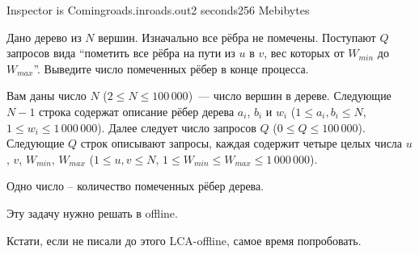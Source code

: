 \begin{problem}{Inspector is Coming}{roads.in}{roads.out}{2 seconds}{256 Mebibytes}


Дано дерево из $N$ вершин.
Изначально все рёбра не помечены.
Поступают $Q$ запросов вида ``пометить все рёбра на пути из $u$ в $v$, вес которых от $W_{min}$ до $W_{max}$''.
Выведите число помеченных рёбер в конце процесса.

\InputFile

Вам даны число $N$ ($2 \le N \le 100\,000$)~--- число вершин в дереве.
Следующие $N-1$ строка содержат описание рёбер дерева $a_i$, $b_i$ и $w_i$ 
($1 \le a_i, b_i \le N$, $1 \le w_i \le 1\,000\,000$).
Далее следует число запросов $Q$ ($0 \le Q \le 100\,000$).
Следующие $Q$ строк описывают запросы, каждая содержит четыре целых числа
$u$, $v$, $W_{min}$, $W_{max}$ ($1 \le u, v \le N$, $1 \le W_{min} \le W_{max} \le 
1\,000\,000$).

\OutputFile

Одно число -- количество помеченных рёбер дерева.

\Examples

\begin{example}
%
%
\end{example}

\Note

Эту задачу нужно решать в offline.

Кстати, если не писали до этого LCA-offline, самое время попробовать.

\end{problem}
